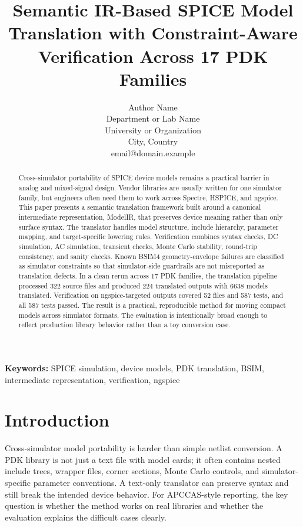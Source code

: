\documentclass[10pt,twocolumn,a4paper]{article}
\begin{document}
\title{Semantic IR-Based SPICE Model Translation with Constraint-Aware Verification Across 17 PDK Families}

\author{Author Name\\Department or Lab Name\\University or Organization\\City, Country\\email@domain.example}
\date{}

\maketitle

\begin{abstract}
Cross-simulator portability of SPICE device models remains a practical barrier in analog and mixed-signal design. Vendor libraries are usually written for one simulator family, but engineers often need them to work across Spectre, HSPICE, and ngspice. This paper presents a semantic translation framework built around a canonical intermediate representation, ModelIR, that preserves device meaning rather than only surface syntax. The translator handles model structure, include hierarchy, parameter mapping, and target-specific lowering rules. Verification combines syntax checks, DC simulation, AC simulation, transient checks, Monte Carlo stability, round-trip consistency, and sanity checks. Known BSIM4 geometry-envelope failures are classified as simulator constraints so that simulator-side guardrails are not misreported as translation defects. In a clean rerun across 17 PDK families, the translation pipeline processed 322 source files and produced 224 translated outputs with 6638 models translated. Verification on ngspice-targeted outputs covered 52 files and 587 tests, and all 587 tests passed. The result is a practical, reproducible method for moving compact models across simulator formats. The evaluation is intentionally broad enough to reflect production library behavior rather than a toy conversion case.
\end{abstract}

\textbf{Keywords:} SPICE simulation, device models, PDK translation, BSIM, intermediate representation, verification, ngspice

\section{Introduction}
Cross-simulator model portability is harder than simple netlist conversion. A PDK library is not just a text file with model cards; it often contains nested include trees, wrapper files, corner sections, Monte Carlo controls, and simulator-specific parameter conventions. A text-only translator can preserve syntax and still break the intended device behavior. For APCCAS-style reporting, the key question is whether the method works on real libraries and whether the evaluation explains the difficult cases clearly.
\end{document}
